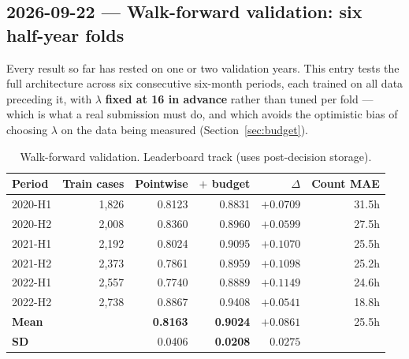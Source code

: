 \subsection{2026-09-22 --- Walk-forward validation: six half-year folds}
\label{sec:walkforward}

Every result so far has rested on one or two validation years. This entry tests the full
architecture across six consecutive six-month periods, each trained on all data preceding it, with
$\lambda$ \textbf{fixed at 16 in advance} rather than tuned per fold --- which is what a real
submission must do, and which avoids the optimistic bias of choosing $\lambda$ on the data being
measured (Section~\ref{sec:budget}).

\begin{table}[htbp]
  \centering
  \caption{Walk-forward validation. Leaderboard track (uses post-decision storage).}
  \label{tab:walkforward}
  \begin{tabular}{lrrrrr}
    \toprule
    Period & Train cases & Pointwise & $+$ budget & $\Delta$ & Count MAE \\
    \midrule
    2020-H1 & 1{,}826 & 0.8123 & 0.8831 & $+0.0709$ & 31.5h \\
    2020-H2 & 2{,}008 & 0.8360 & 0.8960 & $+0.0599$ & 27.5h \\
    2021-H1 & 2{,}192 & 0.8024 & 0.9095 & $+0.1070$ & 25.5h \\
    2021-H2 & 2{,}373 & 0.7861 & 0.8959 & $+0.1098$ & 25.2h \\
    2022-H1 & 2{,}557 & 0.7740 & 0.8889 & $+0.1149$ & 24.6h \\
    2022-H2 & 2{,}738 & 0.8867 & 0.9408 & $+0.0541$ & 18.8h \\
    \midrule
    \textbf{Mean} & & \textbf{0.8163} & \textbf{0.9024} & $\mathbf{+0.0861}$ & 25.5h \\
    \textbf{SD}   & & 0.0406 & \textbf{0.0208} & $0.0275$ & \\
    \bottomrule
  \end{tabular}
\end{table}



